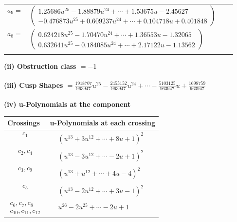 \documentclass[1p]{elsarticle_modified}
\theoremstyle{definition}
\begin{document}
\begin{tabular}{m{7pt} m{180pt} m{7pt} m{180pt} }
\flushright $a_{9}=$&$\begin{pmatrix}1.25686 u^{25}-1.88879 u^{24}+\cdots+1.53675 u-2.45627\\-0.476873 u^{25}+0.609237 u^{24}+\cdots+0.104718 u+0.401848\end{pmatrix}$ \\
\flushright $a_{8}=$&$\begin{pmatrix}0.624218 u^{25}-1.70470 u^{24}+\cdots+1.36553 u-1.32065\\0.632641 u^{25}-0.184085 u^{24}+\cdots+2.17122 u-1.13562\end{pmatrix}$\\&\end{tabular}
\flushleft \textbf{(ii) Obstruction class $= -1$}\\~\\
\flushleft \textbf{(iii) Cusp Shapes $= \frac{1918707}{963947} u^{25}-\frac{2455152}{963947} u^{24}+\cdots-\frac{5103125}{963947} u+\frac{1698759}{963947}$}\\~\\
\newpage\renewcommand{\arraystretch}{1}
\flushleft \textbf{(iv) u-Polynomials at the component}\newline \\
\begin{tabular}{m{50pt}|m{274pt}}
Crossings & \hspace{64pt}u-Polynomials at each crossing \\
\hline $$\begin{aligned}c_{1}\end{aligned}$$&$\begin{aligned}
&(u^{13}+3 u^{12}+\cdots+8 u+1)^{2}
\end{aligned}$\\
\hline $$\begin{aligned}c_{2},c_{4}\end{aligned}$$&$\begin{aligned}
&(u^{13}-3 u^{12}+\cdots-2 u+1)^{2}
\end{aligned}$\\
\hline $$\begin{aligned}c_{3},c_{9}\end{aligned}$$&$\begin{aligned}
&(u^{13}+u^{12}+\cdots+4 u-4)^{2}
\end{aligned}$\\
\hline $$\begin{aligned}c_{5}\end{aligned}$$&$\begin{aligned}
&(u^{13}-2 u^{12}+\cdots+3 u-1)^{2}
\end{aligned}$\\
\hline $$\begin{aligned}c_{6},c_{7},c_{8}\\c_{10},c_{11},c_{12}\end{aligned}$$&$\begin{aligned}
&u^{26}-2 u^{25}+\cdots-2 u+1
\end{aligned}$\\
\hline
\end{tabular}\\~\\
\end{document}
